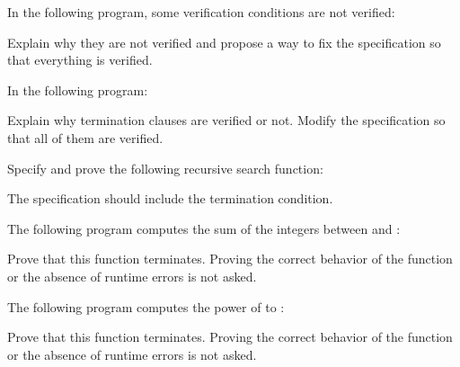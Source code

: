 



In the following program, some verification conditions are not verified:




Explain why they are not verified and propose a way to fix the specification so
that everything is verified.




In the following program:




Explain why termination clauses are verified or not. Modify the specification so
that all of them are verified.




Specify and prove the following recursive search function:




The specification should include the termination condition.




The following program computes the sum of the integers between 
and :




Prove that this function terminates. Proving the correct behavior of the
function or the absence of runtime errors is not asked.




The following program computes the power of  to :




Prove that this function terminates. Proving the correct behavior of the
function or the absence of runtime errors is not asked.
